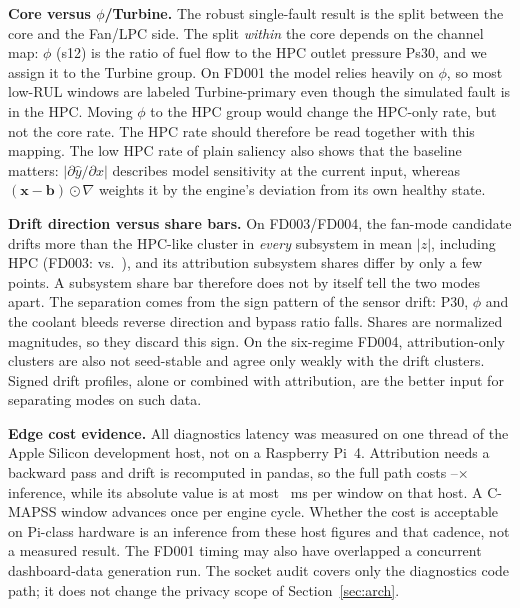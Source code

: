 \textbf{Core versus $\phi$/Turbine.} The robust single-fault result is the split between the core and the Fan/LPC side. The split \emph{within} the core depends on the channel map: $\phi$ (s12) is the ratio of fuel flow to the HPC outlet pressure Ps30, and we assign it to the Turbine group. On FD001 the model relies heavily on $\phi$, so most low-RUL windows are labeled Turbine-primary even though the simulated fault is in the HPC. Moving $\phi$ to the HPC group would change the HPC-only rate, but not the core rate. The HPC rate should therefore be read together with this mapping. The low HPC rate of plain saliency also shows that the baseline matters: $|\partial\hat y/\partial x|$ describes model sensitivity at the current input, whereas $(\mathbf{x}-\mathbf{b})\odot\nabla$ weights it by the engine's deviation from its own healthy state.

\textbf{Drift direction versus share bars.} On FD003/FD004, the fan-mode candidate drifts more than the HPC-like cluster in \emph{every} subsystem in mean $|z|$, including HPC (FD003: \DiagFdThreeCandAbsZHpc{} vs.\ \DiagFdThreeHpcAbsZHpc{}), and its attribution subsystem shares differ by only a few points. A subsystem share bar therefore does not by itself tell the two modes apart. The separation comes from the sign pattern of the sensor drift: P30, $\phi$ and the coolant bleeds reverse direction and bypass ratio falls. Shares are normalized magnitudes, so they discard this sign. On the six-regime FD004, attribution-only clusters are also not seed-stable and agree only weakly with the drift clusters. Signed drift profiles, alone or combined with attribution, are the better input for separating modes on such data.

\textbf{Edge cost evidence.} All diagnostics latency was measured on one thread of the Apple Silicon \texttt{\DiagMachine{}} development host, not on a Raspberry Pi~4. Attribution needs a backward pass and drift is recomputed in pandas, so the full path costs \DiagLatRatioMin{}--\DiagLatRatioMax{}$\times$ inference, while its absolute value is at most \DiagLatFullMax{}~ms per window on that host. A C-MAPSS window advances once per engine cycle. Whether the cost is acceptable on Pi-class hardware is an inference from these host figures and that cadence, not a measured result. The FD001 timing may also have overlapped a concurrent dashboard-data generation run. The socket audit covers only the diagnostics code path; it does not change the privacy scope of Section~\ref{sec:arch}.
